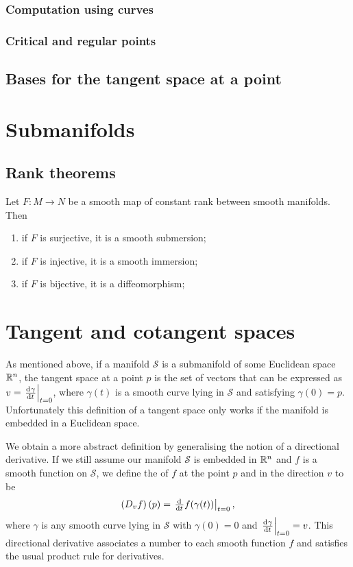 \subsubsection{Computation using curves}

\subsubsection{Critical and regular points}

\subsection{Bases for the tangent space at a point}

\section{Submanifolds}

\subsection{Rank theorems}
\begin{theorem} \label{theorem:globalRank}
Let $F:M\to N$ be a smooth map of constant rank between smooth manifolds. Then
\begin{enumerate}
\item if $F$ is surjective, it is a smooth submersion;
\item if $F$ is injective, it is a smooth immersion;
\item if $F$ is bijective, it is a diffeomorphism;
\end{enumerate}
\end{theorem}

\section{Tangent and cotangent spaces}

As mentioned above, if a manifold $\mathcal{S}$ is a submanifold of some Euclidean space $\mathbb{R}^n$, the tangent space at a point $p$ is the set of vectors that can be expressed as $v = \left.\od{\gamma}{t}\right|_{t=0}$, where $\gamma(t)$ is a smooth curve lying in $\mathcal{S}$ and satisfying $\gamma(0) = p$. Unfortunately this definition of a tangent space only works if the manifold is embedded in a Euclidean space.

We obtain a more abstract definition by generalising the notion of a directional derivative. If we still assume our manifold $\mathcal{S}$ is embedded in $\mathbb{R}^n$ and $f$ is a smooth function on $\mathcal{S}$, we define the  of $f$ at the point $p$ and in the direction $v$ to be
\[ \left(D_vf\right)(p) = \left.\od{}{t}f(\gamma(t))\right|_{t=0}, \]
where $\gamma$ is any smooth curve lying in $\mathcal{S}$ with $\gamma(0) = 0$ and $\left.\od{\gamma}{t}\right|_{t=0} = v$. This directional derivative associates a number to each smooth function $f$ and satisfies the usual product rule for derivatives.

